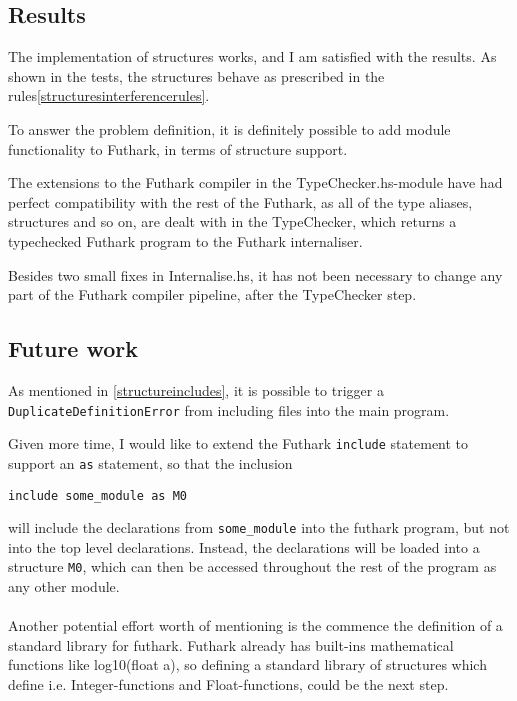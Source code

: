 \subsection{Results}
\label{subsec:structuresresults}
The implementation of structures works, and I am satisfied with the results. As
shown in the tests, the structures behave as prescribed in the rules\ref{structuresinterferencerules}.

To answer the problem definition, it is definitely possible to add module
functionality to Futhark, in terms of structure support.

The extensions to the Futhark compiler in the TypeChecker.hs-module have had perfect compatibility with the rest
of the Futhark, as all of the type aliases, structures and so on, are dealt with
in the TypeChecker, which returns a typechecked Futhark program to the Futhark
internaliser.

Besides two small fixes in Internalise.hs, it has not been necessary to change
any part of the Futhark compiler pipeline, after the TypeChecker step.
\subsection{Future work}
\label{subsec:structuresfuturework}
As mentioned in \ref{structureincludes}, it is possible to trigger a
\texttt{DuplicateDefinitionError} from including files into the main program.

Given more time, I would like to extend the Futhark \texttt{include} statement
to support an \texttt{as} statement, so that the inclusion

\texttt{include some\_module as M0}

will include the declarations from \texttt{some\_module} into the futhark program, but not
into the top level declarations. Instead, the declarations will be loaded into a
structure \texttt{M0}, which can then be accessed throughout the rest of the program as
any other module.
\\
\\
Another potential effort worth of mentioning is the commence the definition of a
standard library for futhark. Futhark already has built-ins mathematical
functions like log10(float a), so defining a standard library of structures
which define i.e. Integer-functions and Float-functions, could be the next step.
